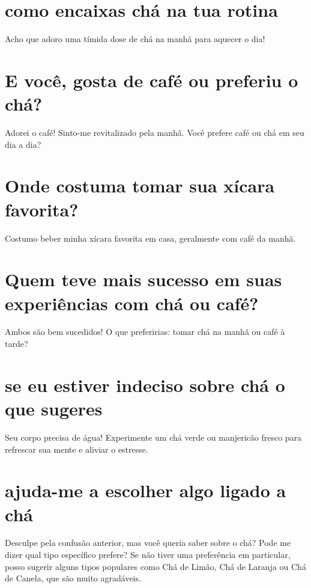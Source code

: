 \documentclass[11pt,a4paper]{article}
\begin{document}
\maketitle
\begin{abstract}Exploração do ollama a partir de sementes banais (nível 2). Teoria continua de fora.\end{abstract}
\section{como encaixas chá na tua rotina}
Acho que adoro uma tímida dose de chá na manhã para aquecer o dia!

\section{E você, gosta de café ou preferiu o chá?}
Adorei o café! Sinto-me revitalizado pela manhã. Você prefere café ou chá em seu dia a dia?

\section{Onde costuma tomar sua xícara favorita?}
Costumo beber minha xícara favorita em casa, geralmente com café da manhã.

\section{Quem teve mais sucesso em suas experiências com chá ou café?}
Ambos são bem sucedidos! O que preferirias: tomar chá na manhã ou café à tarde?

\section{se eu estiver indeciso sobre chá o que sugeres}
Seu corpo precisa de água! Experimente um chá verde ou manjericão fresco para refrescar sua mente e aliviar o estresse.

\section{ajuda-me a escolher algo ligado a chá}
Desculpe pela confusão anterior, mas você queria saber sobre o chá? Pode me dizer qual tipo específico prefere? Se não tiver uma preferência em particular, posso sugerir alguns tipos populares como Chá de Limão, Chá de Laranja ou Chá de Canela, que são muito agradáveis.
\end{document}
